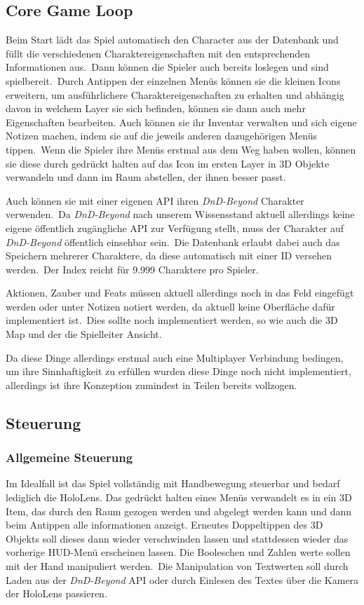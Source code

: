\subsection{Core Game Loop}\label{subsec:chapter_gameloop}

Beim Start lädt das Spiel automatisch den Character aus der Datenbank und füllt die verschiedenen Charaktereigenschaften
mit den entsprechenden Informationen aus.\ Dann können die Spieler auch bereits loslegen und sind spielbereit.\ Durch
Antippen der einzelnen Menüs können sie die kleinen Icons erweitern, um ausführlichere Charaktereigenschaften zu erhalten
und abhängig davon in welchem Layer sie sich befinden, können sie dann auch mehr Eigenschaften bearbeiten.
Auch können sie ihr Inventar verwalten und sich eigene Notizen machen, indem sie auf die jeweils anderen dazugehörigen
Menüs tippen.\ Wenn die Spieler ihre Menüs erstmal aus dem Weg haben wollen, können sie diese durch gedrückt halten auf
das Icon im ersten Layer in 3D Objekte verwandeln und dann im Raum abstellen, der ihnen besser passt.

Auch können sie mit einer eigenen API ihren \textit{DnD-Beyond} Charakter verwenden.\ Da \textit{DnD-Beyond} nach unserem
Wissensstand aktuell allerdings keine eigene öffentlich zugängliche API zur Verfügung stellt, muss der Charakter auf
\textit{DnD-Beyond} öffentlich einsehbar sein.\ Die Datenbank erlaubt dabei auch das Speichern mehrerer Charaktere, da
diese automatisch mit einer ID versehen werden.\ Der Index reicht für 9.999 Charaktere pro Spieler.

Aktionen, Zauber und Feats müssen aktuell allerdings noch in das Feld eingefügt werden oder unter Notizen notiert werden,
da aktuell keine Oberfläche dafür implementiert ist.\ Dies sollte noch implementiert werden, so wie auch die 3D Map
und der die Spielleiter Ansicht.

Da diese Dinge allerdings erstmal auch eine Multiplayer Verbindung bedingen, um ihre Sinnhaftigkeit zu erfüllen wurden
diese Dinge noch nicht implementiert, allerdings ist ihre Konzeption zumindest in Teilen bereits vollzogen.

\subsection{Steuerung}\label{subsec:gameplay_controls}

\subsubsection{Allgemeine Steuerung}
Im Idealfall ist das Spiel vollständig mit Handbewegung steuerbar und bedarf lediglich die HoloLens.
Das gedrückt halten eines Menüs verwandelt es in ein 3D Item, das durch den Raum gezogen werden und abgelegt werden kann
 und dann beim Antippen alle informationen anzeigt.
Erneutes Doppeltippen des 3D Objekts soll dieses dann wieder verschwinden lassen und stattdessen wieder das vorherige
HUD-Menü erscheinen lassen.
Die Booleschen und Zahlen werte sollen mit der Hand manipuliert werden.\ Die Manipulation von Textwerten soll durch
Laden aus der \textit{DnD-Beyond} API oder durch Einlesen des Textes über die Kamera der HoloLens passieren.

